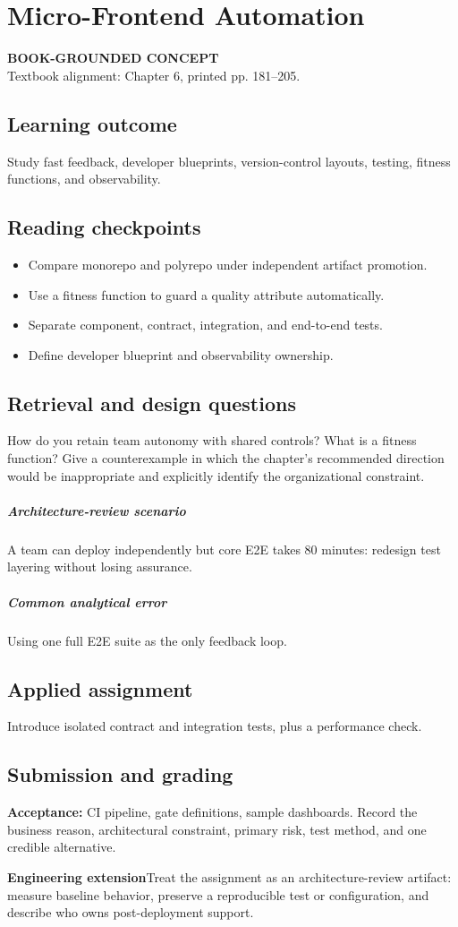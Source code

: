 \documentclass[11pt,letterpaper,oneside]{report}
\newcommand{\based}[1]{\begin{sourcebox}\textbf{BOOK-GROUNDED CONCEPT}\\#1\end{sourcebox}}
\newcommand{\criterion}[1]{\textbf{Acceptance:} #1}
\begin{document}
\chapter{Micro-Frontend Automation}
\based{Textbook alignment: Chapter 6, printed pp. 181--205.}
\section{Learning outcome}
Study fast feedback, developer blueprints, version-control layouts, testing, fitness functions, and observability.
\section{Reading checkpoints}
\begin{itemize}\item Compare monorepo and polyrepo under independent artifact promotion.
\item Use a fitness function to guard a quality attribute automatically.
\item Separate component, contract, integration, and end-to-end tests.
\item Define developer blueprint and observability ownership.
\end{itemize}
\section{Retrieval and design questions}
How do you retain team autonomy with shared controls? What is a fitness function? Give a counterexample in which the chapter's recommended direction would be inappropriate and explicitly identify the organizational constraint.
\paragraph{Architecture-review scenario} A team can deploy independently but core E2E takes 80 minutes: redesign test layering without losing assurance.
\paragraph{Common analytical error} Using one full E2E suite as the only feedback loop.
\section{Applied assignment}
Introduce isolated contract and integration tests, plus a performance check.
\section{Submission and grading}
\criterion{CI pipeline, gate definitions, sample dashboards. Record the business reason, architectural constraint, primary risk, test method, and one credible alternative.}
\begin{engineerbox}\textbf{Engineering extension}\newline Treat the assignment as an architecture-review artifact: measure baseline behavior, preserve a reproducible test or configuration, and describe who owns post-deployment support.\end{engineerbox}
\end{document}
